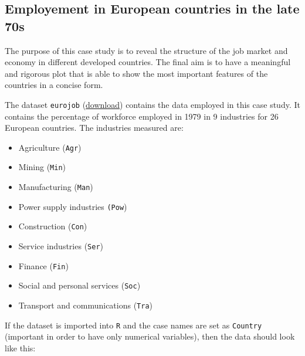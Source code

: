 \documentclass[]{book}
\providecommand{\tightlist}{%
  \setlength{\itemsep}{0pt}\setlength{\parskip}{0pt}}
\begin{document}
\subsection*{Employement in European countries in the late
70s}\label{employement-in-european-countries-in-the-late-70s}

The purpose of this case study is to reveal the structure of the job
market and economy in different developed countries. The final aim is to
have a meaningful and rigorous plot that is able to show the most
important features of the countries in a concise form.

The dataset \texttt{eurojob} (\href{datasets/eurojob.txt}{download})
contains the data employed in this case study. It contains the
percentage of workforce employed in 1979 in 9 industries for 26 European
countries. The industries measured are:

\begin{itemize}
\tightlist
\item
  Agriculture (\texttt{Agr})
\item
  Mining (\texttt{Min})
\item
  Manufacturing (\texttt{Man})
\item
  Power supply industries \texttt{(Pow})
\item
  Construction (\texttt{Con})
\item
  Service industries (\texttt{Ser})
\item
  Finance (\texttt{Fin})
\item
  Social and personal services (\texttt{Soc})
\item
  Transport and communications (\texttt{Tra})
\end{itemize}

If the dataset is imported into \texttt{R} and the case names are set as
\texttt{Country} (important in order to have only numerical variables),
then the data should look like this:
\end{document}
